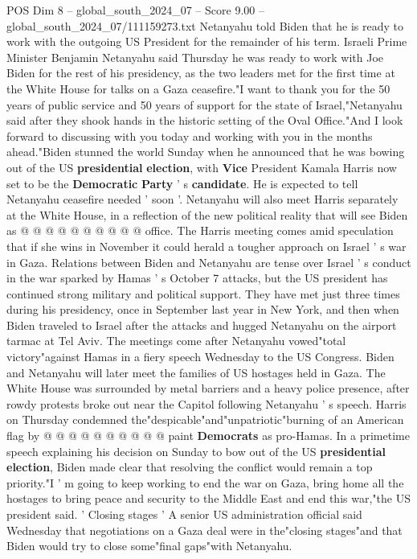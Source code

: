 \begin{textsample}{POS Dim 8 – global\_south\_2024\_07 – Score 9.00 – global\_south\_2024\_07/111159273.txt}  \label{ex:f8_pos_106}
Netanyahu told Biden that he is ready to work with the outgoing US President for the remainder of his term.
Israeli Prime Minister Benjamin Netanyahu said Thursday he was ready to work with Joe Biden for the rest of his presidency, as the two leaders met for the first time at the White House for talks on a Gaza ceasefire."I want to thank you for the 50 years of public service and 50 years of support for the state of Israel,"Netanyahu said after they shook hands in the historic setting of the Oval Office."And I look forward to discussing with you today and working with you in the months ahead."Biden stunned the world Sunday when he announced that he was bowing out of the US \textbf{presidential} \textbf{election}, with \textbf{Vice} President Kamala Harris now set to be the \textbf{Democratic} \textbf{Party} ' s \textbf{candidate}.
He is expected to tell Netanyahu ceasefire needed ' soon '.
Netanyahu will also meet Harris separately at the White House, in a reflection of the new political reality that will see Biden as @ @ @ @ @ @ @ @ @ @ office.
The Harris meeting comes amid speculation that if she wins in November it could herald a tougher approach on Israel ' s war in Gaza.
Relations between Biden and Netanyahu are tense over Israel ' s conduct in the war sparked by Hamas ' s October 7 attacks, but the US president has continued strong military and political support.
They have met just three times during his presidency, once in September last year in New York, and then when Biden traveled to Israel after the attacks and hugged Netanyahu on the airport tarmac at Tel Aviv.
The meetings come after Netanyahu vowed"total victory"against Hamas in a fiery speech Wednesday to the US Congress.
Biden and Netanyahu will later meet the families of US hostages held in Gaza.
The White House was surrounded by metal barriers and a heavy police presence, after rowdy protests broke out near the Capitol following Netanyahu ' s speech.
Harris on Thursday condemned the"despicable"and"unpatriotic"burning of an American flag by @ @ @ @ @ @ @ @ @ @ paint \textbf{Democrats} as pro-Hamas.
In a primetime speech explaining his decision on Sunday to bow out of the US \textbf{presidential} \textbf{election}, Biden made clear that resolving the conflict would remain a top priority."I ' m going to keep working to end the war on Gaza, bring home all the hostages to bring peace and security to the Middle East and end this war,"the US president said. ' Closing stages ' A senior US administration official said Wednesday that negotiations on a Gaza deal were in the"closing stages"and that Biden would try to close some"final gaps"with Netanyahu.

\end{textsample}
